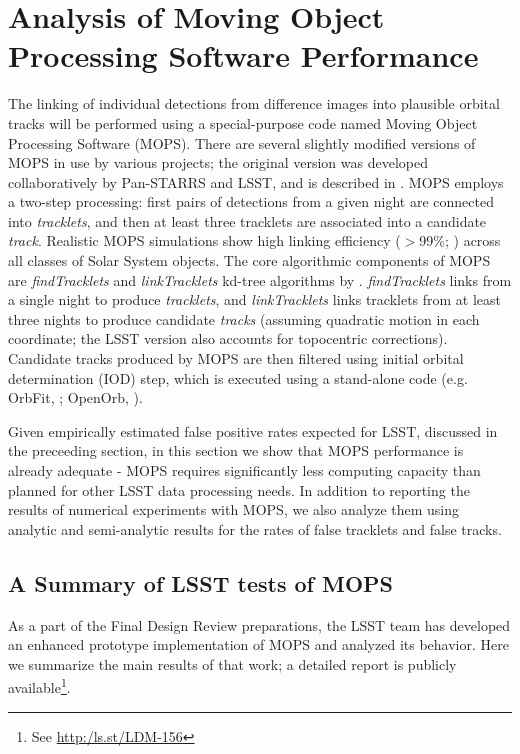 
\section{Analysis of Moving Object Processing Software Performance \label{sec:mops}}


The linking of individual detections from difference images into plausible orbital tracks will be performed using
a special-purpose code named Moving Object Processing Software (MOPS). There are several slightly modified
versions of MOPS in use by various projects; the original version was developed collaboratively by Pan-STARRS
and LSST, and is described in \cite{denneau13}. MOPS employs a two-step processing: first pairs of detections
from a given night are connected into {\it tracklets}, and then at least three tracklets are associated into a
candidate {\it track}. Realistic MOPS simulations show high linking efficiency ($>$99\%; \citealt{denneau13})
across all classes of Solar System objects. The core algorithmic components of MOPS are {\it findTracklets} and
{\it linkTracklets} kd-tree algorithms by \citet{kubica07}. {\it findTracklets} links \DIASources from a single
night to produce {\it tracklets}, and {\it linkTracklets} links tracklets from at least three nights to produce candidate
{\it tracks} (assuming quadratic motion in each coordinate; the LSST version also accounts for topocentric
corrections). Candidate tracks produced by MOPS are then filtered using initial orbital determination (IOD) step,
which is executed using a stand-alone code (e.g. OrbFit, \citealt{milani08}; OpenOrb, \citealt{OpenOrb2009}).

Given empirically estimated false positive rates expected for LSST, discussed in the preceeding section,
in this section we show that MOPS performance is already adequate - MOPS requires significantly less
computing capacity than planned for other LSST data processing needs. In addition to reporting the results of
numerical experiments with MOPS, we also analyze them using analytic and semi-analytic results for the
rates of false tracklets and false tracks.




\subsection{A Summary of LSST tests of MOPS}

As a part of the Final Design Review preparations, the LSST team has developed an enhanced prototype
implementation of MOPS and analyzed its behavior. Here we summarize the main results of that work;
a detailed report is publicly available\footnote{See \url{http:/ls.st/LDM-156}}.

